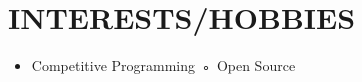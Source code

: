 \documentclass[11pt,a4paper,sans]{moderncv}        %
\begin{document}
\section{INTERESTS/HOBBIES}
\begin{itemize}
\item Competitive Programming \hspace*{40 mm} \textbf{ ◦} Open Source
\end{itemize}





  
\end{document}

